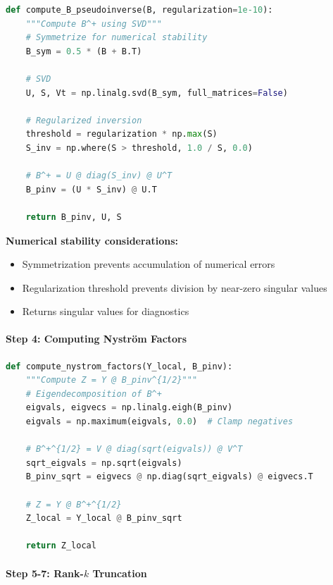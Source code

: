 \documentclass[11pt,a4paper]{article}
\begin{document}
\begin{lstlisting}[language=Python, caption={SVD-based pseudoinverse with regularization}]
def compute_B_pseudoinverse(B, regularization=1e-10):
    """Compute B^+ using SVD"""
    # Symmetrize for numerical stability
    B_sym = 0.5 * (B + B.T)
    
    # SVD
    U, S, Vt = np.linalg.svd(B_sym, full_matrices=False)
    
    # Regularized inversion
    threshold = regularization * np.max(S)
    S_inv = np.where(S > threshold, 1.0 / S, 0.0)
    
    # B^+ = U @ diag(S_inv) @ U^T
    B_pinv = (U * S_inv) @ U.T
    
    return B_pinv, U, S
\end{lstlisting}

\textbf{Numerical stability considerations:}
\begin{itemize}
    \item Symmetrization prevents accumulation of numerical errors
    \item Regularization threshold prevents division by near-zero singular values
    \item Returns singular values for diagnostics
\end{itemize}

\paragraph{Step 4: Computing Nyström Factors}

\begin{lstlisting}[language=Python, caption={Nyström factor computation via matrix square root}]
def compute_nystrom_factors(Y_local, B_pinv):
    """Compute Z = Y @ B_pinv^{1/2}"""
    # Eigendecomposition of B^+
    eigvals, eigvecs = np.linalg.eigh(B_pinv)
    eigvals = np.maximum(eigvals, 0.0)  # Clamp negatives
    
    # B^+^{1/2} = V @ diag(sqrt(eigvals)) @ V^T
    sqrt_eigvals = np.sqrt(eigvals)
    B_pinv_sqrt = eigvecs @ np.diag(sqrt_eigvals) @ eigvecs.T
    
    # Z = Y @ B^+^{1/2}
    Z_local = Y_local @ B_pinv_sqrt
    
    return Z_local
\end{lstlisting}

\paragraph{Step 5-7: Rank-$k$ Truncation}
\end{document}

